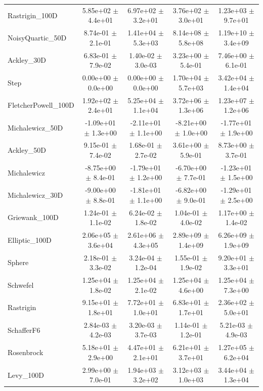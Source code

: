 \begin{table}[h]
\begin{tabular}{lcccc}
Rastrigin_100D & 5.85e+02 $\pm$ 4.4e+01 & 6.97e+02 $\pm$ 3.2e+01 & 3.76e+02 $\pm$ 3.0e+01 & 1.23e+03 $\pm$ 9.7e+01 \\
NoisyQuartic_50D & 8.74e-01 $\pm$ 2.1e-01 & 1.41e+04 $\pm$ 5.3e+03 & 8.14e+08 $\pm$ 5.8e+08 & 1.19e+10 $\pm$ 3.4e+09 \\
Ackley_30D & 6.83e-01 $\pm$ 7.9e-02 & 1.40e-02 $\pm$ 3.0e-03 & 3.23e+00 $\pm$ 5.4e-01 & 7.46e+00 $\pm$ 6.1e-01 \\
Step & 0.00e+00 $\pm$ 0.0e+00 & 0.00e+00 $\pm$ 0.0e+00 & 1.70e+04 $\pm$ 5.7e+03 & 3.42e+04 $\pm$ 1.4e+04 \\
FletcherPowell_100D & 1.92e+02 $\pm$ 2.4e+01 & 5.25e+04 $\pm$ 1.1e+04 & 3.72e+06 $\pm$ 1.3e+06 & 1.23e+07 $\pm$ 1.2e+06 \\
Michalewicz_50D & -1.09e+01 $\pm$ 1.3e+00 & -2.11e+01 $\pm$ 1.1e+00 & -8.21e+00 $\pm$ 1.0e+00 & -1.77e+01 $\pm$ 1.9e+00 \\
Ackley_50D & 9.15e-01 $\pm$ 7.4e-02 & 1.68e-01 $\pm$ 2.7e-02 & 3.61e+00 $\pm$ 5.9e-01 & 8.73e+00 $\pm$ 3.7e-01 \\
Michalewicz & -8.75e+00 $\pm$ 8.4e-01 & -1.79e+01 $\pm$ 1.2e+00 & -6.70e+00 $\pm$ 7.7e-01 & -1.23e+01 $\pm$ 1.5e+00 \\
Michalewicz_30D & -9.00e+00 $\pm$ 8.8e-01 & -1.81e+01 $\pm$ 1.1e+00 & -6.82e+00 $\pm$ 9.0e-01 & -1.29e+01 $\pm$ 2.5e+00 \\
Griewank_100D & 1.24e-01 $\pm$ 1.1e-02 & 6.24e-02 $\pm$ 1.8e-02 & 1.04e-01 $\pm$ 4.0e-02 & 1.17e+00 $\pm$ 1.4e-02 \\
Elliptic_100D & 2.06e+05 $\pm$ 3.6e+04 & 2.61e+06 $\pm$ 4.3e+05 & 2.89e+09 $\pm$ 1.4e+09 & 6.26e+09 $\pm$ 1.9e+09 \\
Sphere & 2.18e-01 $\pm$ 3.3e-02 & 3.24e-04 $\pm$ 1.2e-04 & 1.55e-01 $\pm$ 1.9e-02 & 9.20e+01 $\pm$ 3.3e+01 \\
Schwefel & 1.25e+04 $\pm$ 1.8e-02 & 1.25e+04 $\pm$ 2.1e-02 & 1.25e+04 $\pm$ 4.6e+00 & 1.25e+04 $\pm$ 7.3e+00 \\
Rastrigin & 9.15e+01 $\pm$ 1.8e+01 & 7.72e+01 $\pm$ 1.0e+01 & 6.83e+01 $\pm$ 1.7e+01 & 2.36e+02 $\pm$ 5.0e+01 \\
SchafferF6 & 2.84e-03 $\pm$ 4.2e-03 & 3.20e-03 $\pm$ 3.7e-03 & 1.14e-01 $\pm$ 1.2e-01 & 5.21e-03 $\pm$ 4.9e-03 \\
Rosenbrock & 5.18e+01 $\pm$ 2.9e+00 & 4.47e+01 $\pm$ 2.1e+01 & 6.21e+01 $\pm$ 3.7e+01 & 1.27e+05 $\pm$ 6.2e+04 \\
Levy_100D & 2.99e+00 $\pm$ 7.0e-01 & 1.94e+03 $\pm$ 3.2e+02 & 3.12e+03 $\pm$ 1.0e+03 & 3.44e+04 $\pm$ 1.3e+04 \\

\end{tabular}
\end{table}
